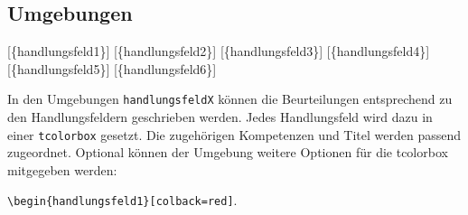 \subsection{Umgebungen}
 \begin{commands}
	 [\{handlungsfeld1\}]
	 [\{handlungsfeld2\}]
	 [\{handlungsfeld3\}]
	 [\{handlungsfeld4\}]
	 [\{handlungsfeld5\}]
	 [\{handlungsfeld6\}]

	In den Umgebungen \texttt{handlungsfeldX} können die Beurteilungen entsprechend zu den
Handlungsfeldern geschrieben werden. Jedes Handlungsfeld wird dazu in einer \texttt{tcolorbox}
gesetzt. Die zugehörigen Kompetenzen und Titel werden passend zugeordnet. Optional können der
	 Umgebung weitere Optionen für die tcolorbox mitgegeben werden:

	 \texttt{\textbackslash begin\{handlungsfeld1\}[colback=red]}.
 \end{commands}
